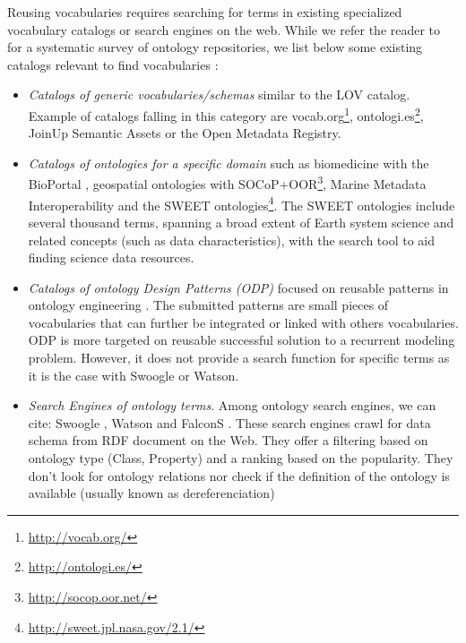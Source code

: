\documentclass{iosart2c}
\begin{document}
Reusing vocabularies requires searching for terms in existing specialized vocabulary catalogs or search engines on the web. While we refer the reader to~\cite{AquinJoWS12} for a systematic survey of ontology repositories, we list below some existing catalogs relevant to find vocabularies \cite{wasabi13}:
\begin{itemize}
 \item \textit{Catalogs of generic vocabularies/schemas} similar to the LOV catalog. Example of catalogs falling in this category are vocab.org\footnote{\url{http://vocab.org/}}, ontologi.es\footnote{\url{http://ontologi.es/}}, JoinUp Semantic Assets or the Open Metadata Registry.
 \item \textit{Catalogs of ontologies for a specific domain} such as biomedicine with the BioPortal \cite{bioportal11}, geospatial ontologies with SOCoP+OOR\footnote{\url{http://socop.oor.net/}}, Marine Metadata Interoperability and the SWEET \cite{sweet05} ontologies\footnote{\url{http://sweet.jpl.nasa.gov/2.1/}}. The SWEET ontologies include several thousand terms, spanning a broad extent of Earth system science and related concepts (such as data characteristics), with the search tool to aid finding science data resources. 
 \item \textit{Catalogs of ontology Design Patterns (ODP)} focused on reusable patterns in ontology engineering \cite{presutti08}. The submitted patterns are small pieces of vocabularies that can further be integrated or linked with others vocabularies. ODP is more targeted on  reusable successful solution to a recurrent modeling problem. However, it does not provide a search function for specific terms as it is the case with Swoogle or Watson.
 \item \textit{Search Engines of ontology terms}. Among ontology search engines, we can cite: Swoogle \cite{finin2005swoogle}, Watson \cite{d2007watson,Sabou07} and FalconS \cite{cheng2008falcons}. These search engines crawl for data schema from RDF document on the Web. They offer a filtering based on ontology type (Class, Property) and a ranking based on the popularity. They don't look for ontology relations nor check if the definition of the ontology is available (usually known as dereferenciation)
\end{itemize}
\end{document}
